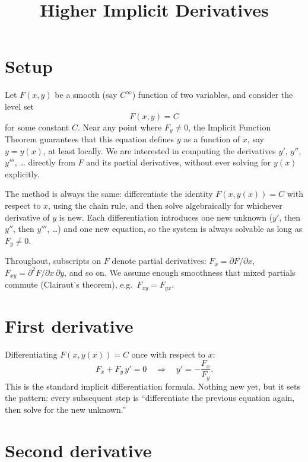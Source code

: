 \documentclass{essay}
\title{Higher Implicit Derivatives}
\author{}
\date{}
\begin{document}
\maketitle

\section{Setup}

Let \(F(x,y)\) be a smooth (say \(C^{\infty}\)) function of two variables, and consider the level
set
\[ F(x,y) = C \]
for some constant \(C\). Near any point where \(F_{y} \neq 0\), the Implicit Function Theorem
guarantees that this equation defines \(y\) as a function of \(x\), say \(y = y(x)\), at least
locally. We are interested in computing the derivatives \(y'\), \(y''\), \(y'''\), \dots{} directly
from \(F\) and its partial derivatives, without ever solving for \(y(x)\) explicitly.

The method is always the same: differentiate the identity \(F(x,y(x)) = C\) with respect to
\(x\), using the chain rule, and then solve algebraically for whichever derivative of \(y\) is
new. Each differentiation introduces one new unknown (\(y'\), then \(y''\), then \(y'''\), \dots{})
and one new equation, so the system is always solvable as long as \(F_{y} \neq 0\).

Throughout, subscripts on \(F\) denote partial derivatives: \(F_{x} = \partial F/\partial x\),
\(F_{xy} = \partial^{2} F/\partial x\, \partial y\), and so on. We assume enough smoothness that
mixed partials commute (Clairaut's theorem), e.g.\ \(F_{xy} = F_{yx}\).

\section{First derivative}

Differentiating \(F(x,y(x)) = C\) once with respect to \(x\):
\[ F_{x} + F_{y}\, y' = 0 \quad\Longrightarrow\quad y' = -\frac{F_{x}}{F_{y}}. \]
This is the standard implicit differentiation formula. Nothing new yet, but it sets the
pattern: every subsequent step is ``differentiate the previous equation again, then solve
for the new unknown.''

\section{Second derivative}
\end{document}
